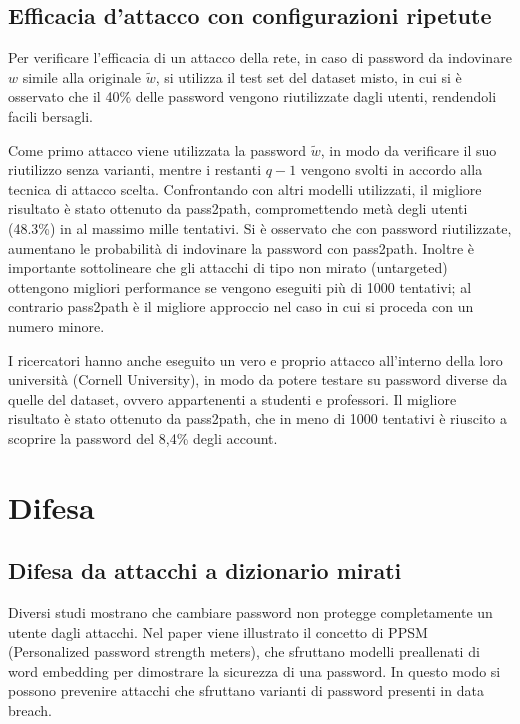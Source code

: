 \subsection{Efficacia d'attacco con configurazioni ripetute}
\label{sec:attacco conf ripetute}
Per verificare l'efficacia di un attacco della rete, in caso di password da indovinare $w$ simile alla originale $\tilde{w}$, si utilizza il test set del dataset misto, in cui si è osservato che il 40\% delle password vengono riutilizzate dagli utenti, rendendoli facili bersagli.

Come primo attacco viene utilizzata la password $\tilde{w}$, in modo da verificare il suo riutilizzo senza varianti, mentre i restanti $q - 1$ vengono svolti in accordo alla tecnica di attacco scelta. Confrontando con altri modelli utilizzati, il migliore risultato è stato ottenuto da pass2path, compromettendo metà degli utenti (48.3\%) in al massimo mille tentativi.
Si è osservato che con password riutilizzate, aumentano le probabilità di indovinare la password con pass2path.
Inoltre è importante sottolineare che gli attacchi di tipo non mirato (untargeted) ottengono migliori performance se vengono eseguiti più di 1000 tentativi; al contrario pass2path è il migliore approccio nel caso in cui si proceda con un numero minore.


I ricercatori hanno anche eseguito un vero e proprio attacco all'interno della loro università (Cornell University), in modo da potere testare su password diverse da quelle del dataset, ovvero appartenenti a studenti e professori. Il migliore risultato è stato ottenuto da pass2path, che in meno di 1000 tentativi è riuscito a scoprire la password del 8,4\% degli account.


\section{Difesa}
\label{sec:difesa}
\subsection{Difesa da attacchi a dizionario mirati}
\label{sec:difesa attacchi mirati}
Diversi studi mostrano che cambiare password non protegge completamente un utente dagli attacchi.
Nel paper viene illustrato il concetto di PPSM (Personalized password strength meters), che sfruttano modelli preallenati di word embedding per dimostrare la sicurezza di una password.
In questo modo si possono prevenire attacchi che sfruttano varianti di password presenti in data breach.

